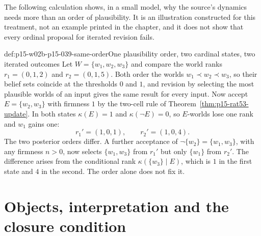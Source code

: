 The following calculation shows, in a small model, why the source's dynamics
needs more than an order of plausibility.  It is an illustration constructed
for this treatment, not an example printed in the chapter, and it does not show
that every ordinal proposal for iterated revision fails.

\begin{hbexample}{def:p15-w02b-p15-039-same-order}{One plausibility order, two cardinal states, two iterated outcomes}
Let \(W=\{w_1,w_2,w_3\}\) and compare the world ranks
\(r_1=(0,1,2)\) and \(r_2=(0,1,5)\).  Both order the worlds
\(w_1\prec w_2\prec w_3\), so their belief sets coincide at the
thresholds \(0\) and \(1\), and revision by selecting the most plausible
worlds of an input gives the same result for every input.  Now accept
\(E=\{w_2,w_3\}\) with firmness \(1\) by the two-cell rule
of Theorem~\ref{thm:p15-rat53-update}.  In both states \(\kappa(E)=1\) and
\(\kappa(\neg E)=0\), so \(E\)-worlds lose one rank and \(w_1\) gains one:
\[
 r_1'=(1,0,1),\qquad r_2'=(1,0,4).
\]
The two posterior orders differ.  A further acceptance of
\(\neg\{w_2\}=\{w_1,w_3\}\), with any firmness \(n>0\), now selects \(\{w_1,w_3\}\) from
\(r_1'\) but only \(\{w_1\}\) from \(r_2'\).  The difference arises from
the conditional rank \(\kappa(\{w_3\}\mid E)\), which is \(1\) in the first
state and \(4\) in the second.  The order alone does not fix it.
\end{hbexample}

\section{Objects, interpretation and the closure condition}

